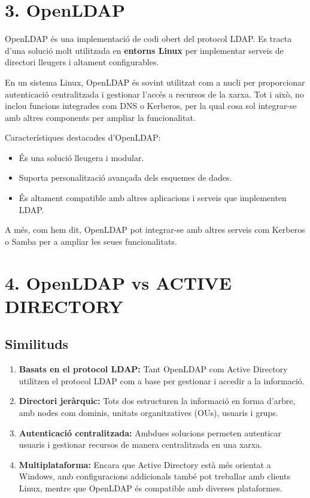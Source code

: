 \documentclass[
  12 pt,
  a4paper,
]{article}
\providecommand{\tightlist}{%
  \setlength{\itemsep}{0pt}\setlength{\parskip}{0pt}}
\begin{document}
\section{3. OpenLDAP}\label{openldap}

OpenLDAP és una implementació de codi obert del protocol LDAP. Es tracta
d'una solució molt utilitzada en \textbf{entorns Linux} per implementar
serveis de directori lleugers i altament configurables.

En un sistema Linux, OpenLDAP és sovint utilitzat com a nucli per
proporcionar autenticació centralitzada i gestionar l'accés a recursos
de la xarxa. Tot i això, no inclou funcions integrades com DNS o
Kerberos, per la qual cosa sol integrar-se amb altres components per
ampliar la funcionalitat.

Característiques destacades d'OpenLDAP:

\begin{itemize}
\tightlist
\item
  És una solució lleugera i modular.
\item
  Suporta personalització avançada dels esquemes de dades.
\item
  És altament compatible amb altres aplicacions i serveis que
  implementen LDAP.
\end{itemize}

A més, com hem dit, OpenLDAP pot integrar-se amb altres serveis com
Kerberos o Samba per a ampliar les seues funcionalitats.

\section{4. OpenLDAP vs ACTIVE
DIRECTORY}\label{openldap-vs-active-directory}

\subsection{Similituds}\label{similituds}

\begin{enumerate}
\def\labelenumi{\arabic{enumi}.}
\tightlist
\item
  \textbf{Basats en el protocol LDAP:} Tant OpenLDAP com Active
  Directory utilitzen el protocol LDAP com a base per gestionar i
  accedir a la informació.
\item
  \textbf{Directori jeràrquic:} Tots dos estructuren la informació en
  forma d'arbre, amb nodes com dominis, unitats organitzatives (OUs),
  usuaris i grups.
\item
  \textbf{Autenticació centralitzada:} Ambdues solucions permeten
  autenticar usuaris i gestionar recursos de manera centralitzada en una
  xarxa.
\item
  \textbf{Multiplataforma:} Encara que Active Directory està més
  orientat a Windows, amb configuracions addicionals també pot treballar
  amb clients Linux, mentre que OpenLDAP és compatible amb diverses
  plataformes.
\end{enumerate}
\end{document}
